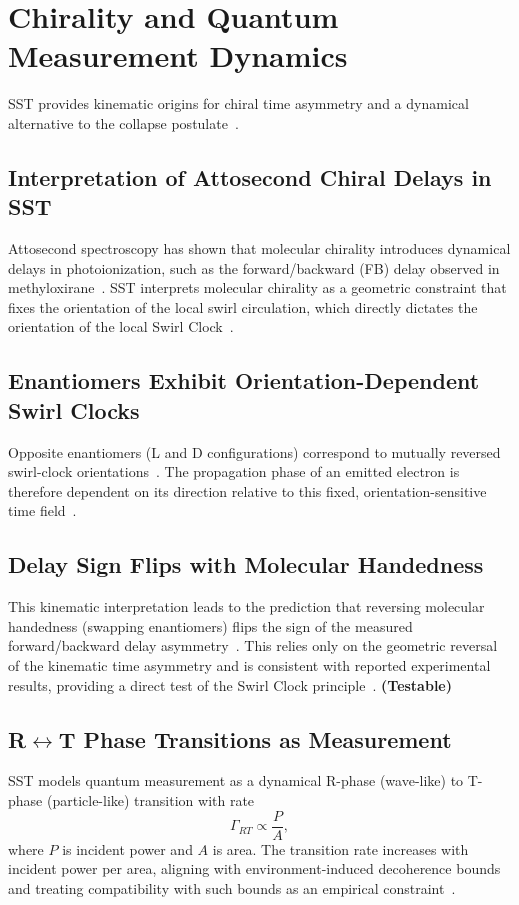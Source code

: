 \documentclass[10pt,reprint,aps,onecolumn,nofootinbib]{revtex4-2}
\newcommand{\testable}{\textbf{(Testable)}}
\begin{document}
\section{Chirality and Quantum Measurement Dynamics}
\label{sec:chirality}
SST provides kinematic origins for chiral time asymmetry and a dynamical alternative to the collapse postulate~\cite{1}.

\subsection*{Interpretation of Attosecond Chiral Delays in SST}
    Attosecond spectroscopy has shown that molecular chirality introduces dynamical delays in photoionization, such as the forward/backward (FB) delay observed in methyloxirane~\cite{6}. SST interprets molecular chirality as a geometric constraint that fixes the orientation of the local swirl circulation, which directly dictates the orientation of the local Swirl Clock~\cite{6}.

\subsection*{Enantiomers Exhibit Orientation-Dependent Swirl Clocks}
    Opposite enantiomers (L and D configurations) correspond to mutually reversed swirl-clock orientations~\cite{6}. The propagation phase of an emitted electron is therefore dependent on its direction relative to this fixed, orientation-sensitive time field~\cite{6}.

\subsection*{Delay Sign Flips with Molecular Handedness}
    This kinematic interpretation leads to the prediction that reversing molecular handedness (swapping enantiomers) flips the sign of the measured forward/backward delay asymmetry~\cite{6}. This relies only on the geometric reversal of the kinematic time asymmetry and is consistent with reported experimental results, providing a direct test of the Swirl Clock principle~\cite{6}. \testable

\subsection*{R$\leftrightarrow$T Phase Transitions as Measurement}
    SST models quantum measurement as a dynamical R-phase (wave-like) to T-phase (particle-like) transition with rate
    \[
        \Gamma_{RT} \propto \frac{P}{A},
    \]
    where $P$ is incident power and $A$ is area. The transition rate increases with incident power per area, aligning with environment-induced decoherence bounds and treating compatibility with such bounds as an empirical constraint~\cite{1}.
\end{document}
